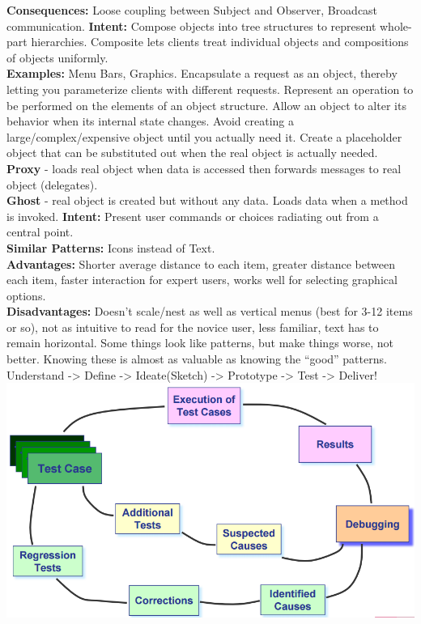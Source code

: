 \documentclass[number]{assignment}
\begin{document}
\begin{landscape}
\begin{multicols}{3}
\textbf{Consequences:} Loose coupling between Subject and Observer, Broadcast communication.
\textbf{Intent:} Compose objects into tree structures to represent whole-part hierarchies. Composite lets clients treat individual objects and compositions of objects uniformly.\\
\textbf{Examples:} Menu Bars, Graphics.
Encapsulate a request as an object, thereby letting you parameterize clients with different requests.
Represent an operation to be performed on the elements of an object structure.
Allow an object to alter its behavior when its internal state changes.
Avoid creating a large/complex/expensive object until you actually need it. Create a placeholder object that can be substituted out when the real object is actually needed.\\
\textbf{Proxy} - loads real object when data is accessed then forwards messages to real object (delegates).\\
\textbf{Ghost} - real object is created but without any data. Loads data when a method is invoked.
\textbf{Intent:} Present user commands or choices radiating out from a central point.\\
\textbf{Similar Patterns:} Icons instead of Text.\\
\textbf{Advantages:} Shorter average distance to each item, greater distance between each item, faster interaction for expert users, works well for selecting graphical options.\\
\textbf{Disadvantages:} Doesn't scale/nest as well as vertical menus (best for 3-12 items or so), not as intuitive to read for the novice user, less familiar, text has to remain horizontal.
Some things look like patterns, but make things worse, not better. Knowing these is almost as valuable as knowing the ``good'' patterns.
Understand -> Define -> Ideate(Sketch) -> Prototype -> Test -> Deliver!
\includegraphics[width=\linewidth]{DebugProcess.png}

\end{multicols}
\end{landscape}
\end{document}
